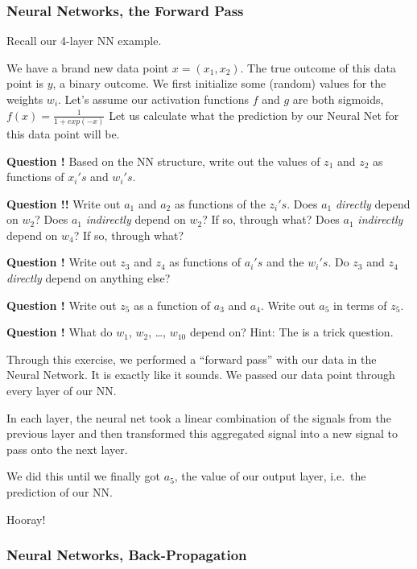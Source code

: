 \documentclass[
]{article}
\begin{document}
\hypertarget{neural-networks-the-forward-pass}{%
\subsubsection{Neural Networks, the Forward
Pass}\label{neural-networks-the-forward-pass}}

Recall our 4-layer NN example.

We have a brand new data point \(x = (x_1, x_2)\). The true outcome of
this data point is \(y\), a binary outcome. We first initialize some
(random) values for the weights \(w_i\). Let's assume our activation
functions \(f\) and \(g\) are both sigmoids,
\(f(x) = \frac{1}{1+exp(-x)}\) Let us calculate what the prediction by
our Neural Net for this data point will be.

\textbf{Question !} Based on the NN structure, write out the values of
\(z_1\) and \(z_2\) as functions of \(x_i's\) and \(w_i's\).

\textbf{Question !!} Write out \(a_1\) and \(a_2\) as functions of the
\(z_i's\). Does \(a_1\) \emph{directly} depend on \(w_2\)? Does \(a_1\)
\emph{indirectly} depend on \(w_2\)? If so, through what? Does \(a_1\)
\emph{indirectly} depend on \(w_4\)? If so, through what?

\textbf{Question !} Write out \(z_3\) and \(z_4\) as functions of
\(a_i's\) and the \(w_i's\). Do \(z_3\) and \(z_4\) \emph{directly}
depend on anything else?

\textbf{Question !} Write out \(z_5\) as a function of \(a_3\) and
\(a_4\). Write out \(a_5\) in terms of \(z_5\).

\textbf{Question !} What do \(w_1\), \(w_2\), \ldots, \(w_{10}\) depend
on? Hint: The is a trick question.

Through this exercise, we performed a ``forward pass'' with our data in
the Neural Network. It is exactly like it sounds. We passed our data
point through every layer of our NN.

In each layer, the neural net took a linear combination of the signals
from the previous layer and then transformed this aggregated signal into
a new signal to pass onto the next layer.

We did this until we finally got \(a_5\), the value of our output layer,
i.e.~the prediction of our NN.

Hooray!

\hypertarget{neural-networks-back-propagation}{%
\subsubsection{Neural Networks,
Back-Propagation}\label{neural-networks-back-propagation}}
\end{document}
